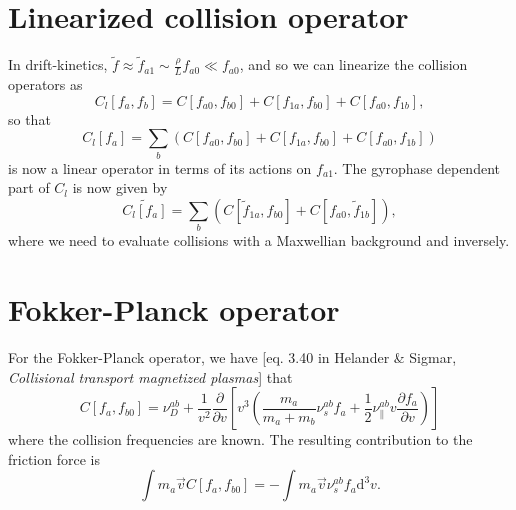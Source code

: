 \documentclass[12pt, a4paper]{article}
\newcommand{\p}{\ensuremath{\partial}}
\renewcommand{\d}{\ensuremath{\mathrm{d}}}
\begin{document}
\section{Linearized collision operator}
In drift-kinetics, $\tilde{f} \approx \tilde{f}_{a1} \sim \frac{\rho}{L} f_{a0} \ll f_{a0}$, and so we can linearize the collision operators as
\begin{equation}
C_l[f_a,f_b] = C[f_{a0},f_{b0}] +  C[f_{1a},f_{b0}] + C[f_{a0},f_{1b}],
\end{equation}
so that
\begin{equation}
C_l[f_a] = \sum_b \left(C[f_{a0},f_{b0}] +  C[f_{1a},f_{b0}] + C[f_{a0},f_{1b}]\right)
\end{equation}
is now a linear operator in terms of its actions on $f_{a1}$. The gyrophase dependent part of $C_l$ is now given by
\begin{equation}
\tilde{C_l[f_a]} = \sum_b \left(C[\tilde{f}_{1a},f_{b0}] + C[f_{a0},\tilde{f}_{1b}]\right),
\end{equation}
where we need to evaluate collisions with a Maxwellian background and inversely. 

\section{Fokker-Planck operator}
For the Fokker-Planck operator, we have [eq. 3.40 in Helander \& Sigmar, \emph{Collisional transport magnetized plasmas}] that
\begin{equation}
C[f_{a},f_{b0}] = \nu_D^{ab} + \frac{1}{v^2} \frac{\p}{\p v} \left[v^3 \left( \frac{m_a}{m_a + m_b} \nu_s^{ab} f_a + \frac{1}{2} \nu_\|^{ab} v \frac{\p f_a}{\p v}\right)\right]
\end{equation}
where the collision frequencies are known. The resulting contribution to the friction force is
\begin{equation}
  \int m_a \vec{v} C[f_{a},f_{b0}] = - \int m_a \vec{v} \nu_s^{ab} f_{a} \d^3 v.
\end{equation}
\end{document}
